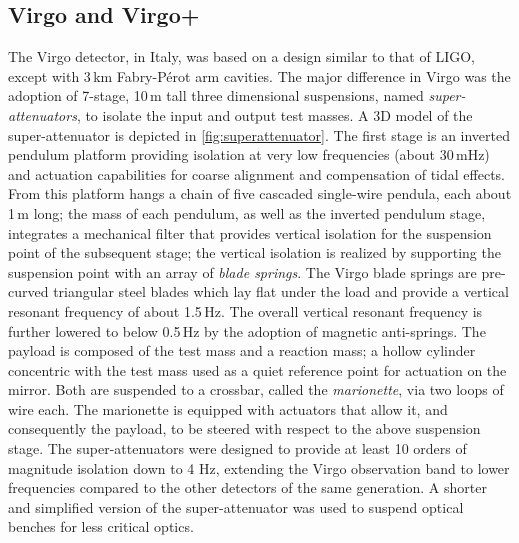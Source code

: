 \subsection{Virgo and Virgo+}\label{sec:Virgo}
The Virgo detector\cite{Accadia_2012}, in Italy, was based on a design similar to that of LIGO, except with 3\,km Fabry-P\'{e}rot arm cavities. 
The major difference in Virgo was the adoption of 7-stage, 10\,m tall three dimensional suspensions, named \textit{super-attenuators}, to isolate the input and output test masses.
A 3D model of the super-attenuator is depicted in \autoref{fig:superattenuator}. The first stage is an inverted pendulum platform providing isolation at very low frequencies (about 30\,mHz) and actuation capabilities for coarse alignment and compensation of tidal effects.
From this platform hangs a chain of five cascaded single-wire pendula, each about 1\,m long; the mass of each pendulum, as well as the inverted pendulum stage, integrates a mechanical filter that provides vertical isolation for the suspension point of the subsequent stage; the vertical isolation is realized by supporting the suspension point with an array of \textit{blade springs}.
The Virgo blade springs are pre-curved triangular steel blades which lay flat under the load and provide a vertical resonant frequency of about 1.5\,Hz.
The overall vertical resonant frequency is further lowered to below 0.5\,Hz by the adoption of magnetic anti-springs.
The payload is composed of the test mass and a reaction mass; a hollow cylinder concentric with the test mass used as a quiet reference point for actuation on the mirror. Both are suspended to a crossbar, called the \textit{marionette}, via two loops of wire each.
The marionette is equipped with actuators that allow it, and consequently the payload, to be steered with respect to the above suspension stage. 
The super-attenuators were designed to provide at least 10 orders of magnitude isolation down to 4 Hz, extending the Virgo observation band to lower frequencies compared to the other detectors of the same generation.
A shorter and simplified version of the super-attenuator was used to suspend optical benches for less critical optics.

